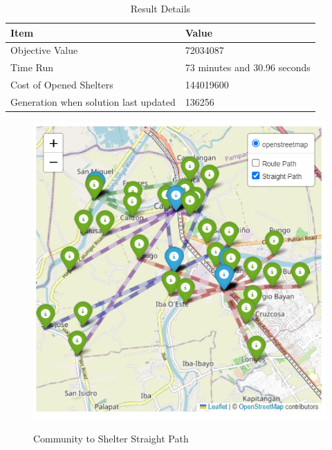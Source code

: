\documentclass[12pt,a4paper,]{article}
\begin{document}
	\begin{table}[h]
		\centering
		\caption{Result Details}
		\label{resdetails}
		\begin{tabular}{|p{}|p{}|}
			\hline
			\textbf{Item} & \textbf{Value} \\ \hline
			Objective Value & 72034087 \\ 
			Time Run  & 73 minutes and 30.96 seconds \\ 
			Cost of Opened Shelters & 144019600 \\ 
			Generation when solution last updated & 136256 \\ \hline
		\end{tabular}
	\end{table}
	
	\begin{figure}[h!]
		\caption{Community to Shelter Straight Path}
		\centering
		\includegraphics[width=\columnwidth]{Chapter 4/straight path}
		\label{straightpath}
	\end{figure}
	
\end{document}
